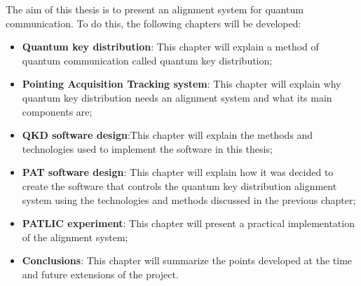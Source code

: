 The aim of this thesis is to present an alignment system for quantum communication. To do this, the following chapters will be developed:
\begin{itemize}
  \item \textbf{Quantum key distribution}: This chapter will explain a method of quantum communication called quantum key distribution;
  \item \textbf{Pointing Acquisition Tracking system}: This chapter will explain why quantum key distribution needs an alignment system and what its main components are;
  \item \textbf{QKD software design}:This chapter will explain the methods and technologies used to implement the software in this thesis;
  \item \textbf{PAT software design}: This chapter will explain how it was decided to create the software that controls the quantum key distribution alignment system using the technologies and methods discussed in the previous chapter;
  \item \textbf{PATLIC experiment}: This chapter will present a practical implementation of the alignment system;
  \item \textbf{Conclusions}: This chapter will summarize the points developed at the time and future extensions of the project.
\end{itemize}